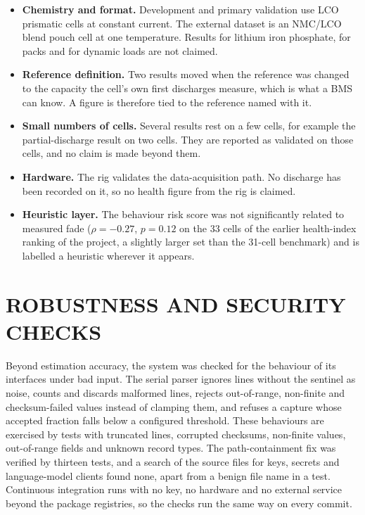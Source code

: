 \documentclass[12pt,a4paper]{amritareport}
\begin{document}
\begin{itemize}
	\item \textbf{Chemistry and format.} Development and primary validation use LCO prismatic cells at constant current. The external dataset is an NMC/LCO blend pouch cell at one temperature. Results for lithium iron phosphate, for packs and for dynamic loads are not claimed.
	\item \textbf{Reference definition.} Two results moved when the reference was changed to the capacity the cell's own first discharges measure, which is what a BMS can know. A figure is therefore tied to the reference named with it.
	\item \textbf{Small numbers of cells.} Several results rest on a few cells, for example the partial-discharge result on two cells. They are reported as validated on those cells, and no claim is made beyond them.
	\item \textbf{Hardware.} The rig validates the data-acquisition path. No discharge has been recorded on it, so no health figure from the rig is claimed.
	\item \textbf{Heuristic layer.} The behaviour risk score was not significantly related to measured fade ($\rho=-0.27$, $p=0.12$ on the 33 cells of the earlier health-index ranking of the project, a slightly larger set than the 31-cell benchmark) and is labelled a heuristic wherever it appears.
\end{itemize}

\section{ROBUSTNESS AND SECURITY CHECKS}

Beyond estimation accuracy, the system was checked for the behaviour of its interfaces under bad input. The serial parser ignores lines without the sentinel as noise, counts and discards malformed lines, rejects out-of-range, non-finite and checksum-failed values instead of clamping them, and refuses a capture whose accepted fraction falls below a configured threshold. These behaviours are exercised by tests with truncated lines, corrupted checksums, non-finite values, out-of-range fields and unknown record types. The path-containment fix was verified by thirteen tests, and a search of the source files for keys, secrets and language-model clients found none, apart from a benign file name in a test. Continuous integration runs with no key, no hardware and no external service beyond the package registries, so the checks run the same way on every commit.
\end{document}
